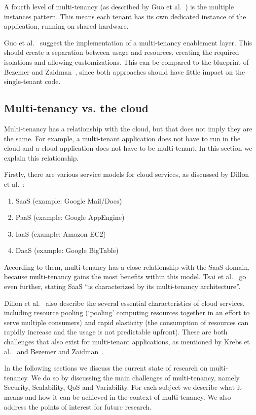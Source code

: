 A fourth level of multi-tenancy (as described by Guo et al.~\cite{guo2007framework}) is the multiple instances pattern. This means each tenant has its own dedicated instance of the application, running on shared hardware.

Guo et al.~\cite{guo2007framework} suggest the implementation of a multi-tenancy enablement layer. This should create a separation between usage and resources, creating the required isolations and allowing customizations. This can be compared to the blueprint of Bezemer and Zaidman~\cite{bezemer2010multi}, since both approaches should have little impact on the single-tenant code.

\subsection{Multi-tenancy vs. the cloud}

Multi-tenancy has a relationship with the cloud, but that does not imply they are the same. For example, a multi-tenant application does not have to run in the cloud and a cloud application does not have to be multi-tenant. In this section we explain this relationship.

Firstly, there are various service models for cloud services, as discussed by Dillon et al.~\cite{dillon2010cloud}:
\begin{enumerate}
\item \acf{SaaS} (example: Google Mail/Docs)
\item \acf{PaaS} (example: Google AppEngine)
\item \acf{IaaS} (example: Amazon EC2)
\item \acf{DaaS} (example: Google BigTable)
\end{enumerate}

According to them, multi-tenancy has a close relationship with the \ac{SaaS} domain, because multi-tenancy gains the most benefits within this model. Tsai et al.~\cite{tsai2010towards} go even further, stating \ac{SaaS} ``is characterized by its multi-tenancy architecture''. 

Dillon et al.~\cite{dillon2010cloud} also describe the several essential characteristics of cloud services, including resource pooling (`pooling' computing resources together in an effort to serve multiple consumers) and rapid elasticity (the consumption of resources can rapidly increase and the usage is not predictable upfront). These are both challenges that also exist for multi-tenant applications, as mentioned by Krebs et al.~\cite{krebs2012architecture} and Bezemer and Zaidman~\cite{bezemer2010multi}.

In the following sections we discuss the current state of research on multi-tenancy. We do so by discussing the main challenges of multi-tenancy, namely Security, Scalability, \ac{QoS} and Variability. For each subject we describe what it means and how it can be achieved in the context of multi-tenancy. We also address the points of interest for future research.